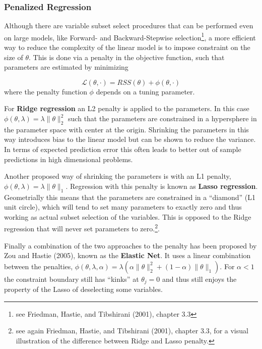 \documentclass[]{article}
\let\rmarkdownfootnote\footnote%
\def\footnote{\protect\rmarkdownfootnote}
\begin{document}
\hypertarget{penalized-regression}{%
\subsubsection{Penalized Regression}\label{penalized-regression}}

Although there are variable subset select procedures that can be
performed even on large models, like Forward- and Backward-Stepwise
selection\footnote{see Friedman, Hastie, and Tibshirani (2001), chapter
  3.3}, a more efficient way to reduce the complexity of the linear
model is to impose constraint on the size of \(\theta\). This is done
via a penalty in the objective function, such that parameters are
estimated by minimizing

\[
\mathcal{L}(\theta,\cdot) = RSS(\theta) + \phi(\theta, \cdot)
\] where the penalty function \(\phi\) depends on a tuning parameter.

For \textbf{Ridge regression} an L2 penalty is applied to the
parameters. In this case
\(\phi(\theta, \lambda) = \lambda \|\theta \|_2^2\) such that the
parameters are constrained in a hypersphere in the parameter space with
center at the origin. Shrinking the parameters in this way introduces
bias to the linear model but can be shown to reduce the variance. In
terms of expected prediction error this often leads to better out of
sample predictions in high dimensional problems.

Another proposed way of shrinking the parameters is with an L1 penalty,
\(\phi(\theta, \lambda) = \lambda \|\theta \|_1\). Regression with this
penalty is known as \textbf{Lasso regression}. Geometrially this means
that the parameters are constrained in a ``diamond'' (L1 unit circle),
which will tend to set many parameters to exactly zero and thus working
as actual subset selection of the variables. This is opposed to the
Ridge regression that will never set parameters to zero.\footnote{see
  again Friedman, Hastie, and Tibshirani (2001), chapter 3.3, for a
  visual illustration of the difference between Ridge and Lasso penalty.}.

Finally a combination of the two approaches to the penalty has been
proposed by Zou and Hastie (2005), known as the \textbf{Elastic Net}. It
uses a linear combination between the penalties,
\(\phi(\theta, \lambda, \alpha) = \lambda \left( \alpha \|\theta \|_2^2 + (1-\alpha) \|\theta \|_1 \right)\).
For \(\alpha < 1\) the constraint boundary still has ``kinks'' at
\(\theta_j = 0\) and thus still enjoys the property of the Lasso of
deselecting some variables.
\end{document}

